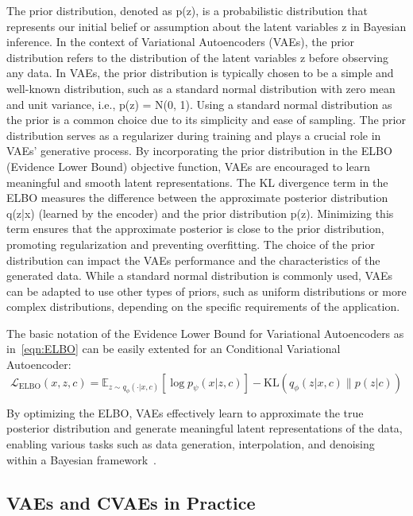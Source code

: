 The prior distribution, denoted as p(z), is a probabilistic distribution that represents our initial belief or assumption about the latent variables z in Bayesian inference. In the context of Variational Autoencoders (VAEs), the prior distribution refers to the distribution of the latent variables z before observing any data.
In VAEs, the prior distribution is typically chosen to be a simple and well-known distribution, such as a standard normal distribution with zero mean and unit variance, i.e., p(z) = N(0, 1). Using a standard normal distribution as the prior is a common choice due to its simplicity and ease of sampling.
The prior distribution serves as a regularizer during training and plays a crucial role in VAEs' generative process. By incorporating the prior distribution in the ELBO (Evidence Lower Bound) objective function, VAEs are encouraged to learn meaningful and smooth latent representations. The KL divergence term in the ELBO measures the difference between the approximate posterior distribution q(z|x) (learned by the encoder) and the prior distribution p(z). Minimizing this term ensures that the approximate posterior is close to the prior distribution, promoting regularization and preventing overfitting.
The choice of the prior distribution can impact the VAEs performance and the characteristics of the generated data. While a standard normal distribution is commonly used, VAEs can be adapted to use other types of priors, such as uniform distributions or more complex distributions, depending on the specific requirements of the application.
\fi

The basic notation of the Evidence Lower Bound for Variational Autoencoders as in~\eqref{eqn:ELBO} can be easily extented for an Conditional Variational Autoencoder:
\begin{equation}\label{eqn:ELBO-CVAE}
	\mathcal{L}_\text{ELBO}(x, z, c) = \mathbb{E}_{z\sim q_\phi(\cdot|x, c)} \left[ \log p_\psi(x|z, c) \right] - \text{KL}\left( q_\phi(z|x, c) \| p(z|c) \right)
\end{equation}

By optimizing the ELBO, VAEs effectively learn to approximate the true posterior distribution and generate meaningful latent representations of the data, enabling various tasks such as data generation, interpolation, and denoising within a Bayesian framework~\cite{pml2Book}.

\subsection{VAEs and CVAEs in Practice}

